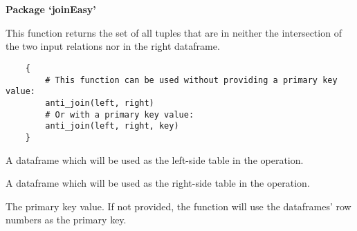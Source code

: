 \documentclass[a4paper]{book}
\begin{document}
\chapter*{}
\begin{center}
{\textbf{\huge Package `joinEasy'}}
\par\bigskip{\large \today}
\end{center}
\begin{description}
\raggedright{}
\item[Type]
\item[Title]
\item[Version]
\item[Date]
\item[Author]
\item[Maintainer]\AsIs{}
\item[Description]
\item[Depends]
\item[License]
\end{description}
%
\begin{Description}\relax
This function returns the set of all tuples that are in neither the intersection of the two input relations nor in the right dataframe.
\end{Description}
%
\begin{Usage}
\begin{verbatim}
    {
        # This function can be used without providing a primary key value:
        anti_join(left, right)
        # Or with a primary key value:
        anti_join(left, right, key)
    }
\end{verbatim}
\end{Usage}
%
\begin{Arguments}
\begin{ldescription}
\item[\code{left}] A dataframe which will be used as the left-side table in the operation.
\item[\code{right}] A dataframe which will be used as the right-side table in the operation.
\item[\code{key}] The primary key value. If not provided, the function will use the dataframes' row numbers as the primary key.
\end{ldescription}
\end{Arguments}
\end{document}
